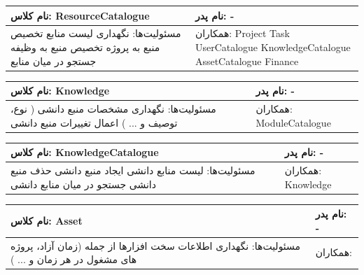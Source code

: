 \documentclass{article}
\begin{document}
\begin{tabular}{|p{6cm}|p{6cm}|}
\hline
نام کلاس: ResourceCatalogue
&
نام پدر: -
\\
\hline
مسئولیت‌ها:
\newline
نگهداری لیست منابع
\newline
تخصیص منبع به پروژه
\newline
تخصیص منبع به وظیفه
\newline
جستجو در میان منابع

&
همکاران:
\newline
Project
\newline
Task
\newline
UserCatalogue
\newline
KnowledgeCatalogue
\newline
AssetCatalogue
\newline
Finance
\\
\hline
\end{tabular}
\vspace{1cm}

\begin{tabular}{|p{6cm}|p{6cm}|}
\hline
نام کلاس: Knowledge
&
نام پدر: -
\\
\hline
مسئولیت‌ها:
\newline
نگهداری مشخصات منبع دانشی ( نوع، توصیف و ... )
\newline
اعمال تغییرات منبع دانشی

&
همکاران:
\newline
ModuleCatalogue
\\
\hline
\end{tabular}
\vspace{1cm}

\begin{tabular}{|p{6cm}|p{6cm}|}
\hline
نام کلاس: KnowledgeCatalogue
&
نام پدر: -
\\
\hline
مسئولیت‌ها:
\newline
لیست منابع دانشی
\newline
ایجاد منبع دانشی 
\newline
حذف منبع دانشی
\newline
جستجو در میان منابع دانشی
&
همکاران:
\newline
Knowledge
\\
\hline
\end{tabular}
\vspace{1cm}

\begin{tabular}{|p{6cm}|p{6cm}|}
\hline
نام کلاس: Asset
&
نام پدر: - 
\\
\hline
مسئولیت‌ها:
\newline
نگهداری اطلاعات سخت افزارها از جمله (زمان آزاد، پروژه های مشغول در هر زمان و ... )
&
همکاران:
\\
\hline
\end{tabular}
\vspace{1cm}
\end{document}
